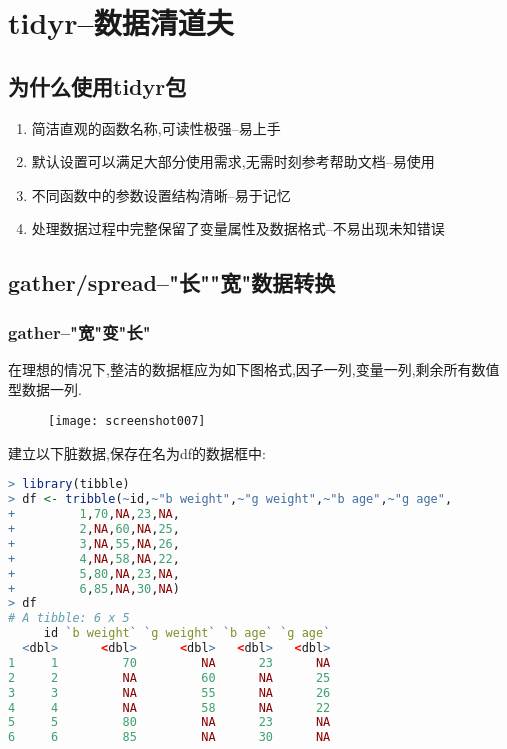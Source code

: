 \documentclass[11pt,a4paper,oneside]{book}
\begin{document}
\section{tidyr--数据清道夫}
\subsection{为什么使用tidyr包}
\begin{enumerate}
	\item 简洁直观的函数名称,可读性极强--易上手
	\item 默认设置可以满足大部分使用需求,无需时刻参考帮助文档--易使用
	\item 不同函数中的参数设置结构清晰--易于记忆
	\item 处理数据过程中完整保留了变量属性及数据格式--不易出现未知错误
\end{enumerate}
\subsection{gather/spread--"长""宽"数据转换}
\subsubsection{gather--"宽"变"长"}
在理想的情况下,整洁的数据框应为如下图格式,因子一列,变量一列,剩余所有数值型数据一列.
\begin{figure}[H]
	\centering
	\texttt{[image: screenshot007]}
\end{figure}

建立以下脏数据,保存在名为df的数据框中:
\begin{lstlisting}[language=r]
> library(tibble)
> df <- tribble(~id,~"b weight",~"g weight",~"b age",~"g age",
+         1,70,NA,23,NA,
+         2,NA,60,NA,25,
+         3,NA,55,NA,26,
+         4,NA,58,NA,22,
+         5,80,NA,23,NA,
+         6,85,NA,30,NA)
> df
# A tibble: 6 x 5
     id `b weight` `g weight` `b age` `g age`
  <dbl>      <dbl>      <dbl>   <dbl>   <dbl>
1     1         70         NA      23      NA
2     2         NA         60      NA      25
3     3         NA         55      NA      26
4     4         NA         58      NA      22
5     5         80         NA      23      NA
6     6         85         NA      30      NA
\end{lstlisting}
\end{document}
